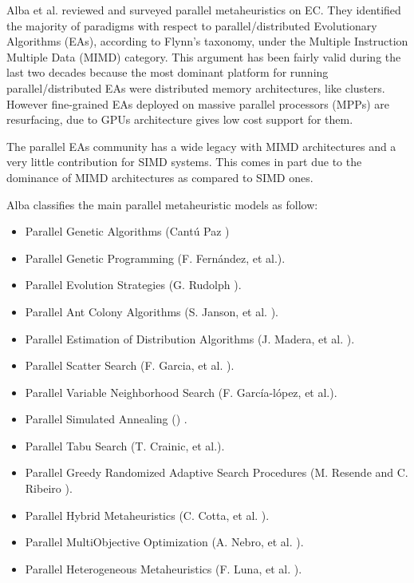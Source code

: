 \documentclass[review]{elsarticle}
\begin{document}
Alba et al. \cite{Alba2005book} reviewed and surveyed parallel metaheuristics on EC. They identified the majority of paradigms with respect to parallel/distributed Evolutionary Algorithms (EAs), according to Flynn's taxonomy, under the Multiple Instruction Multiple Data (MIMD) category. This argument has been fairly valid during the last two decades because the most dominant platform for running parallel/distributed EAs were distributed memory architectures, like clusters. However fine-grained EAs deployed on massive parallel processors (MPPs) are resurfacing, due to GPUs architecture gives low cost support for them.

The parallel EAs community has a wide legacy with MIMD architectures and a very little contribution for SIMD systems. This comes in part due to the dominance of MIMD architectures as compared to SIMD ones.

Alba classifies the main parallel metaheuristic models as follow: %
\begin{itemize}
\item Parallel Genetic Algorithms (Cant\'u Paz \cite{Cantu-Paz98asurvey}) %
\item Parallel Genetic Programming (F. Fern\'andez, et al.\cite{springerlink:10.1023_A:1021873026259}).
\item Parallel Evolution Strategies (G. Rudolph \cite{Rudolph92parallelapproaches}).
\item Parallel Ant Colony Algorithms (S. Janson, et al. \cite{ParallelAntColony}).
\item Parallel Estimation of Distribution Algorithms (J. Madera, et al. \cite{springerlink:10.1007_3_540_32494_1_7}).
\item Parallel Scatter Search (F. Garcia, et al. \cite{GarciaLopez2003575}).
\item Parallel Variable Neighborhood Search (F. Garc\'ia-l\'opez, et al.\cite{Garcia_lopez_theparallel}).
\item Parallel Simulated Annealing (\cite{Genetic_parallelsimulated}) .
\item Parallel Tabu Search (T. Crainic, et al.\cite{Crainic97towardsa}).
\item Parallel Greedy Randomized Adaptive Search Procedures (M. Resende and C. Ribeiro \cite{Resendeparallelgreedy}).
\item Parallel Hybrid Metaheuristics (C. Cotta, et al. \cite{Cotta05e:parallel}). 
\item Parallel MultiObjective Optimization (A. Nebro, et al. \cite{Nebro07mocell:a}).
\item Parallel Heterogeneous Metaheuristics (F. Luna, et al. \cite{ANL04}). 
\end{itemize}
\end{document}
